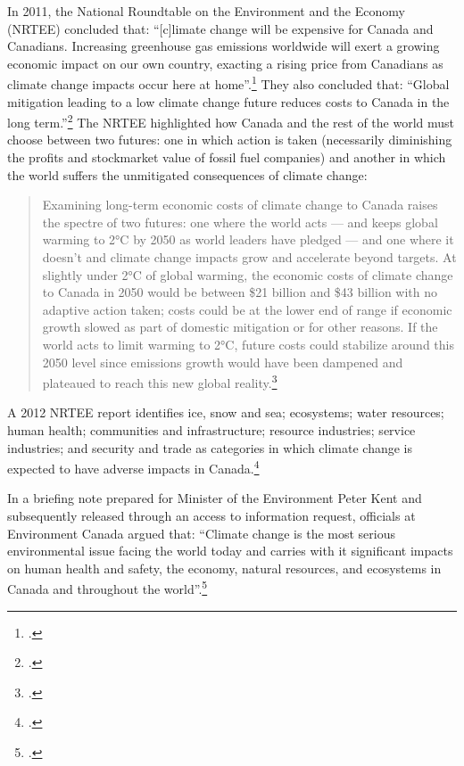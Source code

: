 \documentclass[10pt]{article}
\begin{document}
In 2011, the National Roundtable on the Environment and the Economy (NRTEE) concluded that: ``[c]limate change will be expensive for Canada and Canadians. Increasing greenhouse gas emissions worldwide will exert a growing economic impact on our own country, exacting a rising price from Canadians as climate change impacts occur here at home''.\footcite[][p.15]{NRTEEPrice}
They also concluded that: ``Global mitigation leading to a low climate change future reduces costs to Canada in the long term.''\footcite[][p.16]{NRTEEPrice}
The NRTEE highlighted how Canada and the rest of the world must choose between two futures: one in which action is taken (necessarily diminishing the profits and stockmarket value of fossil fuel companies) and another in which the world suffers the unmitigated consequences of climate change:
\begin{quote}
Examining long-term economic costs of climate change to Canada raises the spectre of two futures: one where the world acts — and keeps global warming to 2°C by 2050 as world leaders have pledged — and one where it doesn't and climate change impacts grow and accelerate beyond targets. At slightly under 2°C of global warming, the economic costs of climate change to Canada in 2050 would be between \$21 billion and \$43 billion with no adaptive action taken; costs could be at the lower end of range if economic growth slowed as part of domestic mitigation or for other reasons. If the world acts to limit warming to 2°C, future costs could stabilize around this 2050 level since emissions growth would have been dampened and plateaued to reach this new global reality.\footcite[][p.18]{NRTEEPrice}
\end{quote}
A 2012 NRTEE report identifies ice, snow and sea; ecosystems; water resources; human health; communities and infrastructure; resource industries; service industries; and security and trade as categories in which climate change is expected to have adverse impacts in Canada.\footcite[][p. 41]{DegreesOfChange}



In a briefing note prepared for Minister of the Environment Peter Kent and subsequently released through an access to information request, officials at Environment Canada argued that: ``Climate change is the most serious environmental issue facing the world today and carries with it significant impacts on human health and safety, the economy, natural resources, and ecosystems in Canada and throughout the world''.\footcite[][]{BureaucratsUrged}
\end{document}
